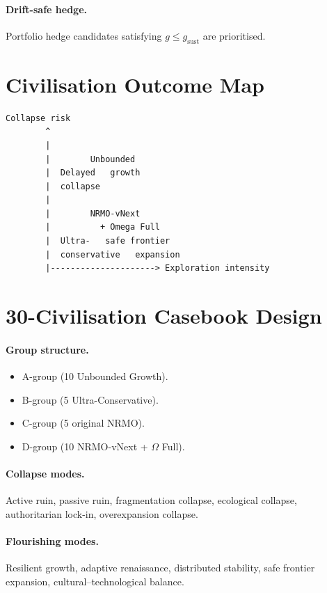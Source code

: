 \paragraph{Drift-safe hedge.}
Portfolio hedge candidates satisfying $g \le g_{\mathrm{sust}}$ are
prioritised.

\section{Civilisation Outcome Map}
\label{sec:omega-outcome-map}

\begin{lstlisting}[basicstyle=\ttfamily\scriptsize,frame=single]
   Collapse risk
        ^
        |
        |        Unbounded
        |  Delayed   growth
        |  collapse
        |
        |        NRMO-vNext
        |          + Omega Full
        |  Ultra-   safe frontier
        |  conservative   expansion
        |---------------------> Exploration intensity
\end{lstlisting}

\section{30-Civilisation Casebook Design}
\label{sec:omega-casebook-design}

\paragraph{Group structure.}

\begin{itemize}
\item A-group (10 Unbounded Growth).
\item B-group (5 Ultra-Conservative).
\item C-group (5 original NRMO).
\item D-group (10 NRMO-vNext + $\Omega$ Full).
\end{itemize}

\paragraph{Collapse modes.}
Active ruin, passive ruin, fragmentation collapse, ecological
collapse, authoritarian lock-in, overexpansion collapse.

\paragraph{Flourishing modes.}
Resilient growth, adaptive renaissance, distributed stability, safe
frontier expansion, cultural--technological balance.

